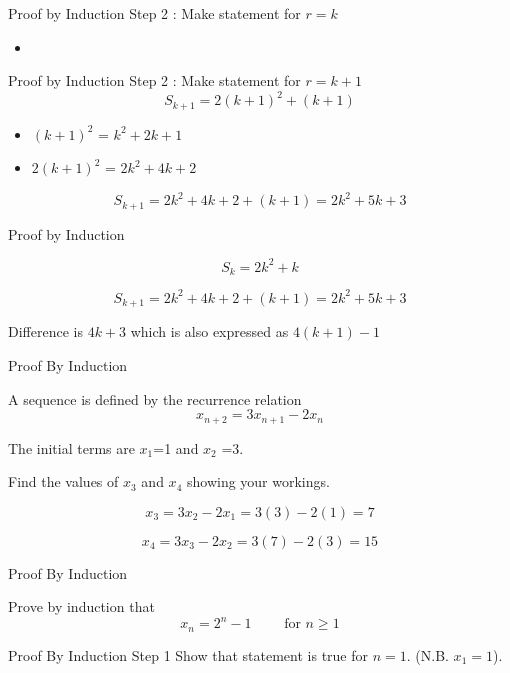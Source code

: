 
{Proof by Induction}
Step 2  : Make statement for $r=k$
\begin{itemize}
\item 
\end{itemize}


{Proof by Induction}
Step 2  : Make statement for $r=k+1$
\[S_{k+1} = 2(k+1)^2 + (k+1)\]
\begin{itemize}
\item $(k+1)^2$ = $k^2 + 2k + 1$
\item $2(k+1)^2$ = $2k^2 + 4k + 2$
\end{itemize}
\[S_{k+1} = 2k^2 + 4k + 2+ (k+1) = 2k^2 + 5k + 3 \]


{Proof by Induction}

\[S_{k} = 2k^2 + k\]

\[S_{k+1} = 2k^2 + 4k + 2+ (k+1) = 2k^2 + 5k + 3 \]

Difference is $4k+3$ which is also expressed as $4(k+1)-1$



{Proof By Induction}


A sequence is defined by the recurrence relation
\[ x_{n+2} = 3x_{n+1} - 2x_{n} \]

The initial terms are $x_1$=1 and $x_2$ =3.

Find the values of $x_3$ and $x_4$ showing your workings.

\[ x_{3} = 3x_{2} - 2x_{1} = 3(3) - 2(1) = 7 \]

\[ x_{4} = 3x_{3} - 2x_{2} = 3(7) - 2(3) = 15 \]




{Proof By Induction}

Prove by induction that
\[ x_n = 2^n - 1 \qquad \mbox{ for } n \geq 1 \]




{Proof By Induction}
Step 1 Show that statement is true for $n=1$.
(N.B. $x_{1} = 1$).

